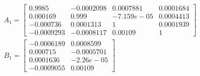 \begin{itemize}
\begin{align*}
	& A_1 =
	\begin{bmatrix}
			0.9985 & -0.0002098 &  0.0007881 & 0.0001684 \\
		  0.000169 &      0.999 & -7.159e-05 & 0.0004413 \\
		 -0.000736 &  0.0001313 &          1 & 0.0001939 \\
		-0.0009293 & -0.0008117 &    0.00109 &         1
	\end{bmatrix}\\
	& B_1 =
	\begin{bmatrix}
		-0.0006189 &  0.0008599 \\
		  0.000715 & -0.0005701 \\
		 0.0001636 &  -2.26e-05 \\
		-0.0009055 &    0.00109
	\end{bmatrix}
\end{align*}


\end{itemize}
